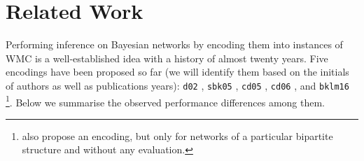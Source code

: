 \documentclass[accepted]{uai2021}
\theoremstyle{definition}
\begin{document}
\section{Related Work} \label{sec:related}

Performing inference on Bayesian networks by encoding them into instances of WMC
is a well-established idea with a history of almost twenty years. Five encodings
have been proposed so far (we will identify them based on the initials of
authors as well as publications years): \texttt{d02}
\citep{DBLP:conf/kr/Darwiche02}, \texttt{sbk05} \citep{DBLP:conf/aaai/SangBK05},
\texttt{cd05} \citep{DBLP:conf/ijcai/ChaviraD05}, \texttt{cd06}
\citep{DBLP:conf/sat/ChaviraD06}, and \texttt{bklm16}
\citep{DBLP:conf/ecai/BartKLM16}\footnote{\citet{DBLP:conf/scai/VomlelT13} also
  propose an encoding, but only for networks of a particular bipartite structure
  and without any evaluation.}. Below we summarise the observed performance
differences among them.
\end{document}
